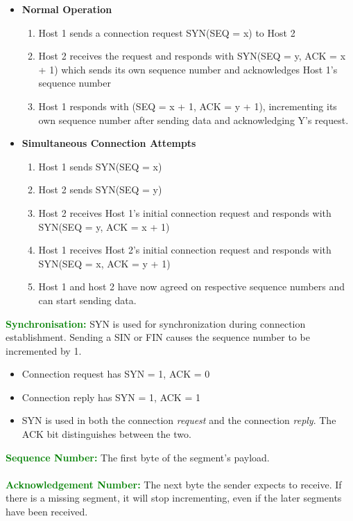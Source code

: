 \documentclass[a4paper,10pt]{article}
\begin{document}
\begin{itemize}
	\item \textbf{Normal Operation} 
	\begin{enumerate}
		\item Host 1 sends a connection request SYN(SEQ = x) to Host 2 
		\item Host 2 receives the request and responds with SYN(SEQ = y, ACK = x + 1) which sends its own sequence number and acknowledges Host 1's sequence number 
		\item Host 1 responds with (SEQ = x + 1, ACK = y + 1), incrementing its own sequence number after sending data and acknowledging Y's request. 
	\end{enumerate}
	\item \textbf{Simultaneous Connection Attempts} 
	\begin{enumerate}
		\item Host 1 sends SYN(SEQ = x)
		\item Host 2 sends SYN(SEQ = y)
		\item Host 2 receives Host 1's initial connection request and responds with \\
		SYN(SEQ = y, ACK = x + 1)
		\item Host 1 receives Host 2's initial connection request and responds with \\
		SYN(SEQ = x, ACK = y + 1)
		\item Host 1 and host 2 have now agreed on respective sequence numbers and can start sending data. 
	\end{enumerate}
\end{itemize}
\textcolor{Green}{\textbf{Synchronisation:}} SYN is used for synchronization during connection establishment. Sending a SIN or FIN causes the sequence number to be incremented by 1. 
\begin{itemize}
	\item Connection request has SYN = 1, ACK = 0 
	\item Connection reply has SYN = 1, ACK = 1
	\item SYN is used in both the connection \emph{request} and the connection \emph{reply}. The ACK bit distinguishes between the two. 
\end{itemize}
\textcolor{Green}{\textbf{Sequence Number:}} The first byte of the segment's payload. \\\\
\textcolor{Green}{\textbf{Acknowledgement Number:}} The next byte the sender expects to receive. If there is a missing segment, it will stop incrementing, even if the later segments have been received. \\\\
\end{document}
